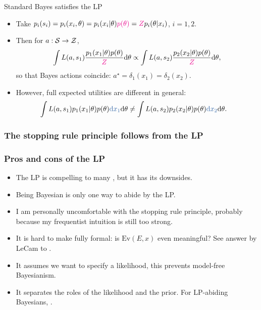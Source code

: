 \documentclass[10pt]{beamer}
\begin{document}
\begin{frame}{Standard Bayes satisfies the LP}
\begin{itemize}
  \item Take $p_i(s_i) = p_i(x_i,\theta) = p_i(x_i\vert\theta)\textcolor{magenta}{p(\theta)} = \textcolor{magenta}{Z} p_i(\theta\vert x_i)$, $i=1,2$.
  \vfill
  \item Then for $a:\mathcal{S}\rightarrow\mathcal{Z}$,
  $$ \int L(a,s_1) \frac{p_1(x_1\vert\theta)p(\theta)}{\textcolor{magenta}{Z}} {\rm d}\theta \propto \int L(a,s_2) \frac{p_2(x_2\vert\theta)p(\theta)}{\textcolor{magenta}{Z}} {\rm d}\theta, $$
  so that Bayes actions coincide: $a^\star = \delta_1(x_1) = \delta_2(x_2)$.
  \vfill
  \item However, full expected utilities are different in general:
  \begin{align*}
    \int L(a,s_1) p_1(x_1\vert\theta)p(\theta) \unn{\d x_1}\d\theta
    &\neq \int L(a,s_2) p_2(x_2\vert\theta)p(\theta) \unn{\d x_2}\d\theta.
  \end{align*}
\end{itemize}
\end{frame}

\begin{frame}
  \frametitle{The stopping rule principle follows from the LP}
\end{frame}

\begin{frame}
\frametitle{Pros and cons of the LP}
\begin{itemize}
  \item The LP is compelling to many \citep{BeWo88}, but it has its downsides.
  \item Being Bayesian is only one way to abide by the LP.
  \item I am personally uncomfortable with the stopping rule principle, probably because my frequentist intuition is still too strong.
  \item It is hard to make fully formal: is $\text{Ev}(E,x)$ even meaningful? See answer by LeCam to \citep{BeWo88}.
  \item It assumes we want to specify a likelihood, this prevents model-free Bayesianism.
  \item It separates the roles of the likelihood and the prior. For LP-abiding Bayesians, .
\end{itemize}
\end{frame}

\end{document}
